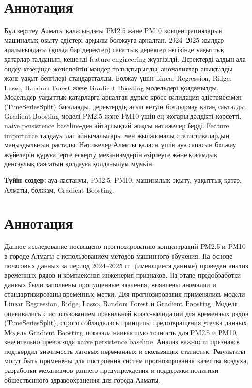 \documentclass[12pt,a4paper]{article}
\begin{document}
\section*{Аннотация}

Бұл зерттеу Алматы қаласындағы PM2.5 және PM10 концентрацияларын машиналық оқыту әдістері арқылы болжауға арналған. 2024–2025 жылдар аралығындағы (қолда бар деректер) сағаттық деректер негізінде уақыттық қатарлар талданып, кешенді feature engineering жүргізілді. Деректерді алдын ала өңдеу кезеңінде жетіспейтін мәндер толықтырылды, аномалиялар анықталды және уақыт белгілері стандартталды. Болжау үшін Linear Regression, Ridge, Lasso, Random Forest және Gradient Boosting модельдері қолданылды. Модельдер уақыттық қатарларға арналған дұрыс кросс-валидация әдістемесімен (TimeSeriesSplit) бағаланды, деректердің ағып кетуін болдырмау қатаң сақталды. Gradient Boosting моделі PM2.5 және PM10 үшін ең жоғары дәлдікті көрсетті, naive persistence baseline-ден айтарлықтай жақсы нәтижелер берді. Feature importance талдауы лаг айнымалылары мен жылжымалы статистикалардың маңыздылығын растады. Нәтижелер Алматы қаласы үшін ауа сапасын болжау жүйелерін құруға, ерте ескерту механизмдерін әзірлеуге және қоғамдық денсаулық саясатын қолдауға қолданылуы мүмкін.

\textbf{Түйін сөздер:} ауа ластануы, PM2.5, PM10, машиналық оқыту, уақыттық қатар, Алматы, болжам, Gradient Boosting.

\vspace{1cm}

\section*{Аннотация}

Данное исследование посвящено прогнозированию концентраций PM2.5 и PM10 в городе Алматы с использованием методов машинного обучения. На основе почасовых данных за период 2024–2025 гг. (имеющиеся данные) проведен анализ временных рядов и комплексная инженерия признаков. На этапе предобработки данных были заполнены пропущенные значения, выявлены аномалии и стандартизированы временные метки. Для прогнозирования применялись модели Linear Regression, Ridge, Lasso, Random Forest и Gradient Boosting. Модели оценивались с использованием правильной кросс-валидации для временных рядов (TimeSeriesSplit), строго соблюдались принципы предотвращения утечки данных. Модель Gradient Boosting показала наивысшую точность для PM2.5 и PM10, значительно превосходя naive persistence baseline. Анализ важности признаков подтвердил значимость лаговых переменных и скользящих статистик. Результаты могут быть применены для построения систем прогнозирования качества воздуха, разработки механизмов раннего предупреждения и поддержки политики общественного здравоохранения для города Алматы.
\end{document}
